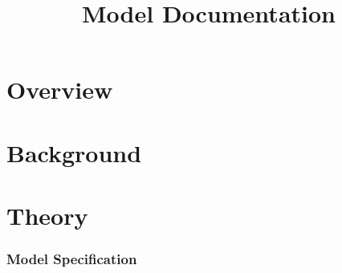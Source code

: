 \documentclass[11pt, oneside]{article}   	%
\title{Model Documentation}
\author{}
\begin{document}
\maketitle

\section{Overview}
\section{Background}
\section{Theory}

\subsubsection{Model Specification}
% 
\end{document}
